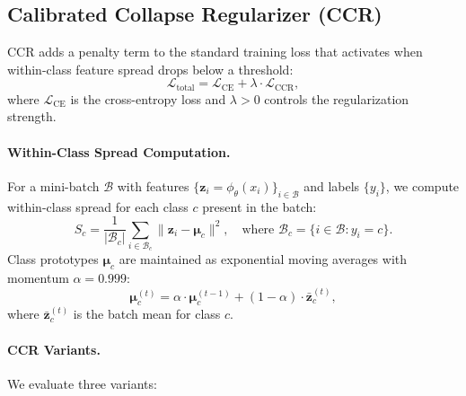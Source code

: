 \documentclass{article}
\newcommand{\loss}{\mathcal{L}}
\begin{document}
\subsection{Calibrated Collapse Regularizer (CCR)}

CCR adds a penalty term to the standard training loss that activates when within-class feature spread drops below a threshold:
\begin{equation}
    \loss_{\text{total}} = \loss_{\text{CE}} + \lambda \cdot \loss_{\text{CCR}},
\end{equation}
where $\loss_{\text{CE}}$ is the cross-entropy loss and $\lambda > 0$ controls the regularization strength.

\paragraph{Within-Class Spread Computation.}
For a mini-batch $\mathcal{B}$ with features $\{\mathbf{z}_i = \phi_\theta(x_i)\}_{i \in \mathcal{B}}$ and labels $\{y_i\}$, we compute within-class spread for each class $c$ present in the batch:
\begin{equation}
    S_c = \frac{1}{|\mathcal{B}_c|} \sum_{i \in \mathcal{B}_c} \|\mathbf{z}_i - \boldsymbol{\mu}_c\|^2, \quad \text{where } \mathcal{B}_c = \{i \in \mathcal{B} : y_i = c\}.
\end{equation}
Class prototypes $\boldsymbol{\mu}_c$ are maintained as exponential moving averages with momentum $\alpha = 0.999$:
\begin{equation}
    \boldsymbol{\mu}_c^{(t)} = \alpha \cdot \boldsymbol{\mu}_c^{(t-1)} + (1 - \alpha) \cdot \bar{\mathbf{z}}_c^{(t)},
\end{equation}
where $\bar{\mathbf{z}}_c^{(t)}$ is the batch mean for class $c$.

\paragraph{CCR Variants.}
We evaluate three variants:
\end{document}
